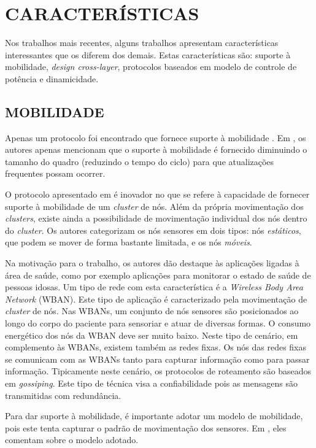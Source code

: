 \documentclass[12pt]{article}
\begin{document}
  \section{CARACTERÍSTICAS}
  \label{caracteristicas}
  Nos trabalhos mais recentes, alguns trabalhos apresentam características interessantes que os diferem dos demais. Estas características são: suporte à mobilidade, \emph{design cross-layer},
protocolos baseados em modelo de controle de potência e dinamicidade.

  \subsection{MOBILIDADE}
    Apenas um protocolo foi encontrado que fornece suporte à mobilidade \cite{20103113115754}. Em \cite{20100312645920}, os autores apenas mencionam que o suporte à mobilidade é fornecido diminuindo o tamanho do quadro (reduzindo o tempo do ciclo) para que atualizações frequentes possam ocorrer.
    
    O protocolo apresentado em \cite{20103113115754} é inovador no que se refere à capacidade de fornecer suporte à mobilidade de um \textit{cluster} de nós. Além da própria movimentação dos \textit{clusters}, existe ainda a possibilidade de movimentação individual dos nós dentro do \textit{cluster}. Os autores categorizam os nós sensores em dois tipos: nós \textit{estáticos}, que podem se mover de forma bastante limitada, e os nós \textit{móveis}.

    Na motivação para o trabalho, os autores dão destaque às aplicações ligadas à área de saúde, como por exemplo aplicações para monitorar o estado de saúde de pessoas idosas. Um tipo de rede com esta característica é a \textit{Wireless Body Area Network} (WBAN). Este tipo de aplicação é caracterizado pela movimentação de \textit{cluster} de nós. Nas WBANs, um conjunto de nós sensores são posicionados ao longo do corpo do paciente para sensoriar e atuar de diversas formas. O consumo energético dos nós da WBAN deve ser muito baixo. Neste tipo de cenário, em complemento às WBANs, existem também as redes fixas. Os nós das redes fixas se comunicam com as WBANs tanto para capturar informação como para passar informação. Tipicamente neste cenário, os protocolos de roteamento são baseados em \textit{gossiping}. Este tipo de técnica visa a confiabilidade pois as mensagens são transmitidas com redundância.

    Para dar suporte à mobilidade, é importante adotar um modelo de mobilidade, pois este tenta capturar o padrão de movimentação dos sensores. Em \cite{20103113115754}, eles comentam sobre o modelo adotado.
\end{document}
